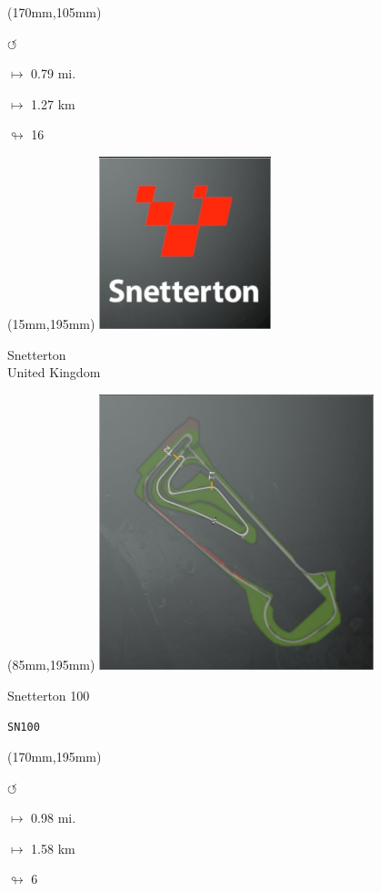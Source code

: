 \begin{textblock*}{30mm}(170mm,105mm)%
\par \Huge$\circlearrowleft$
\Large
\par$\mapsto$ 0.79 mi.
\par$\mapsto$ 1.27 km
\par$\looparrowright$ 16
\end{textblock*}
\begin{textblock*}{60mm}(15mm,195mm)%
\includegraphics[width=50mm]{LG/2015-05-20_00095.png}
\par Snetterton\\ United Kingdom
\end{textblock*}
\begin{textblock*}{80mm}(85mm,195mm)%
\includegraphics[width=80mm]{TR/2015-05-20_00062.png}
\centerline{Snetterton 100}
\par\hfill\tiny\tt SN100\\
\end{textblock*}
\begin{textblock*}{30mm}(170mm,195mm)%
\par \Huge$\circlearrowleft$
\Large
\par$\mapsto$ 0.98 mi.
\par$\mapsto$ 1.58 km
\par$\looparrowright$ 6
\end{textblock*}
\null\newpage

